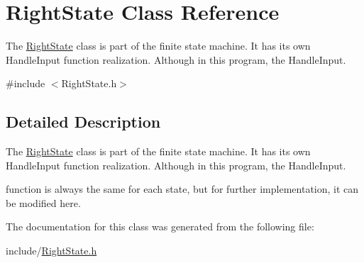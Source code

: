 \hypertarget{class_right_state}{}\section{Right\+State Class Reference}
\label{class_right_state}


The \mbox{\hyperlink{class_right_state}{Right\+State}} class is part of the finite state machine. It has its own Handle\+Input function realization. Although in this program, the Handle\+Input.  




{\ttfamily \#include $<$Right\+State.\+h$>$}



\subsection{Detailed Description}
The \mbox{\hyperlink{class_right_state}{Right\+State}} class is part of the finite state machine. It has its own Handle\+Input function realization. Although in this program, the Handle\+Input. 

function is always the same for each state, but for further implementation, it can be modified here. 

The documentation for this class was generated from the following file\+:\begin{DoxyCompactItemize}
\item 
include/\mbox{\hyperlink{_right_state_8h}{Right\+State.\+h}}\end{DoxyCompactItemize}
